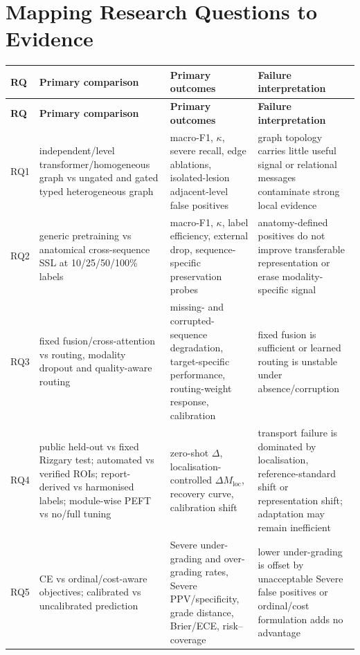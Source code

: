 \section{Mapping Research Questions to Evidence}
\label{sec:method-rq-mapping}

\begin{longtable}{p{1.0cm}p{4.8cm}p{4.4cm}p{3.8cm}}
\toprule
\textbf{RQ} & \textbf{Primary comparison} & \textbf{Primary outcomes} & \textbf{Failure interpretation}\\
\midrule
\endfirsthead
\toprule
\textbf{RQ} & \textbf{Primary comparison} & \textbf{Primary outcomes} & \textbf{Failure interpretation}\\
\midrule
\endhead
RQ1 & independent/level transformer/homogeneous graph vs ungated and gated typed heterogeneous graph & macro-F1, $\kappa$, severe recall, edge ablations, isolated-lesion adjacent-level false positives & graph topology carries little useful signal or relational messages contaminate strong local evidence\\
RQ2 & generic pretraining vs anatomical cross-sequence SSL at 10/25/50/100\% labels & macro-F1, $\kappa$, label efficiency, external drop, sequence-specific preservation probes & anatomy-defined positives do not improve transferable representation or erase modality-specific signal\\
RQ3 & fixed fusion/cross-attention vs routing, modality dropout and quality-aware routing & missing- and corrupted-sequence degradation, target-specific performance, routing-weight response, calibration & fixed fusion is sufficient or learned routing is unstable under absence/corruption\\
RQ4 & public held-out vs fixed Rizgary test; automated vs verified ROIs; report-derived vs harmonised labels; module-wise PEFT vs no/full tuning & zero-shot $\Delta$, localisation-controlled $\Delta M_{\mathrm{loc}}$, recovery curve, calibration shift & transport failure is dominated by localisation, reference-standard shift or representation shift; adaptation may remain inefficient\\
RQ5 & CE vs ordinal/cost-aware objectives; calibrated vs uncalibrated prediction & Severe under-grading and over-grading rates, Severe PPV/specificity, grade distance, Brier/ECE, risk--coverage & lower under-grading is offset by unacceptable Severe false positives or ordinal/cost formulation adds no advantage\\
\bottomrule
\end{longtable}

